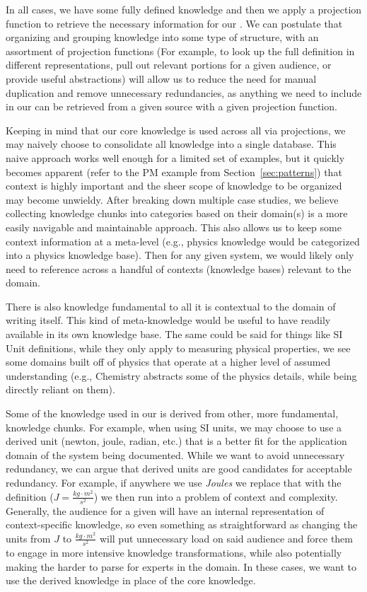 In all cases, we have some fully defined knowledge and then we apply 
a projection function to retrieve the necessary information for our \sf{}. We 
can postulate that organizing and grouping knowledge into some type of 
structure, with an assortment of projection functions (For example, to look up 
the full definition in different representations, pull out relevant portions 
for a given audience, or provide useful abstractions) will allow us to reduce 
the need for manual duplication and remove unnecessary redundancies, as 
anything we need to include in our \sfs{} can be retrieved from a given source 
with a given projection function.

Keeping in mind that our core knowledge is used across all \sfs{} via 
projections, we may naively choose to consolidate all knowledge into a single
database. This naive approach works well enough for a limited set of examples, 
but it quickly becomes apparent (refer to the PM example from 
Section~\ref{sec:patterns}) that context is highly important and the sheer 
scope of knowledge to be organized may become unwieldy. After breaking down 
multiple case studies, we believe collecting knowledge chunks into categories 
based on their domain(s) is a more easily navigable and maintainable approach. 
This also allows us to keep some context information at a meta-level (e.g.,
physics knowledge would be categorized into a physics knowledge base). Then for
any given system, we would likely only need to reference across a handful of 
contexts (knowledge bases) relevant to the domain.

There is also knowledge fundamental to all \sfs{}\textemdash{}it is contextual 
to the domain of \sf{} writing itself. This kind of meta-knowledge would be 
useful to have readily available in its own knowledge base. The same could be
said for things like SI Unit definitions, while they only apply to measuring 
physical properties, we see some domains built off of physics that operate at a 
higher level of assumed understanding (e.g., Chemistry abstracts some of the
physics details, while being directly reliant on them).

Some of the knowledge used in our \sfs{} is derived from other, more 
fundamental, knowledge chunks. For example, when using SI units, we may choose 
to use a derived unit (newton, joule, radian, etc.) that is a better fit for 
the application domain of the system being documented. While we want to avoid 
unnecessary redundancy, we can argue that derived units are good candidates for 
acceptable redundancy. For example, if anywhere we use \emph{Joules} we replace 
that with the definition ($J = \frac{kg\cdot{}m^2}{s^2}$) we then run into a 
problem of context and complexity. Generally, the audience for a given \sf{} 
will have an internal representation of context-specific knowledge, so even 
something as straightforward as changing the units from $J$ to 
$\frac{kg\cdot{}m^2}{s^2}$ will put unnecessary load on said audience and force 
them to engage in more intensive knowledge transformations, while also 
potentially making the \sfs{} harder to parse for experts in the domain. In 
these cases, we want to use the derived knowledge in place of the core 
knowledge.


